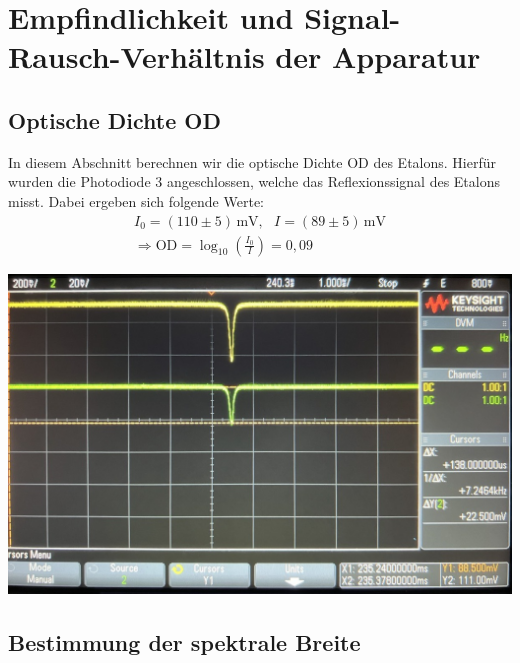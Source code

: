 \newpage

\section{Empfindlichkeit und Signal-Rausch-Verhältnis der Apparatur}
\label{sec:signalRausch}

\subsection{Optische Dichte OD}
\label{sub:opDichte}

In diesem Abschnitt berechnen wir die optische Dichte OD des Etalons. Hierfür wurden die Photodiode 3 angeschlossen, welche das Reflexionssignal des Etalons misst. Dabei ergeben sich folgende Werte:
\begin{gather}
    I_0 = (110 \pm 5)\,\mathrm{mV}, ~~~I = (89 \pm 5)\,\mathrm{mV}\\[0,5cm]
    \Rightarrow \boxed{\mathrm{OD} = \log_{10}\left(\frac{I_0}{I}\right) = 0,09}
\end{gather} 

\begin{center}
    \captionsetup{type=figure}
    \includegraphics[scale=0.2]{Bilder/Signal-Rausch/signal-rausch_od.jpg}
    \label{fig:opDichte}
\end{center}

\subsection{Bestimmung der spektrale Breite}
\label{sub:specBreite}


